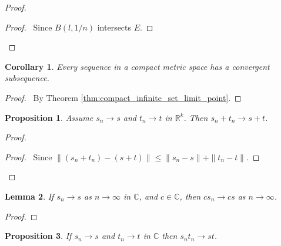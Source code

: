 \documentclass{book}
\let\qed\relax
\newtheorem{prop}{Proposition}[chapter]
\newtheorem{cor}{Corollary}[prop]
\newtheorem{lm}[prop]{Lemma}
\theoremstyle{definition}
\begin{document}
\begin{proof}
\pf
{}
\begin{proof}
	\pf\ Since $B(l,1/n)$ intersects $E$.
\end{proof}
\qed
\end{proof}

\begin{cor}
\label{cor:convergent_subsequence}
Every sequence in a compact metric space has a convergent subsequence.
\end{cor}

\begin{proof}
\pf\ By Theorem \ref{thm:compact_infinite_set_limit_point}. \qed
\end{proof}

\begin{prop}
\label{prop:limit_of_sum}
Assume $s_n \rightarrow s$ and $t_n \rightarrow t$ in $\mathbb{R}^k$. Then $s_n + t_n \rightarrow s + t$.
\end{prop}

\begin{proof}
\pf
{}
\begin{proof}
	\pf\ Since $\| (s_n + t_n) - (s + t) \| \leq \| s_n - s \| + \| t_n - t \|$.
\end{proof}
\qed
\end{proof}

\begin{lm}
If $s_n \rightarrow s$ as $n \rightarrow \infty$ in $\mathbb{C}$, and $c \in \mathbb{C}$, then $c s_n \rightarrow cs$ as $n \rightarrow \infty$.
\end{lm}

\begin{proof}
\pf
{}
\qed
\end{proof}

\begin{prop}
\label{prop:limit_of_product}
If $s_n \rightarrow s$ and $t_n \rightarrow t$ in $\mathbb{C}$ then $s_n t_n \rightarrow st$.
\end{prop}
\end{document}
